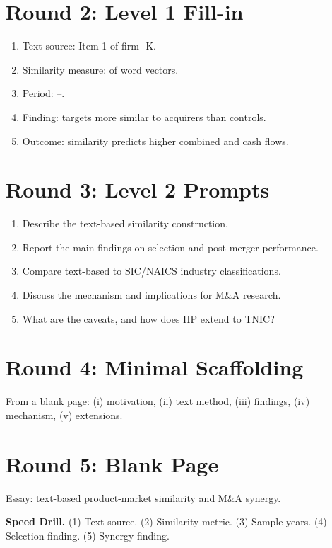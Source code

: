 \documentclass[11pt]{article}
\newcommand{\blank}[1]{\underline{\hspace{#1}}}
\begin{document}
\section*{Round 2: Level 1 Fill-in}
\begin{enumerate}
\item Text source: Item 1 of firm \blank{1cm}-K.
\item Similarity measure: \blank{2cm} of word vectors.
\item Period: \blank{1cm}--\blank{1cm}.
\item Finding: targets more similar to acquirers than \blank{2cm} controls.
\item Outcome: similarity predicts higher combined \blank{2cm} and cash flows.
\end{enumerate}

\section*{Round 3: Level 2 Prompts}
\begin{enumerate}
\item Describe the text-based similarity construction.
\item Report the main findings on selection and post-merger performance.
\item Compare text-based to SIC/NAICS industry classifications.
\item Discuss the mechanism and implications for M\&A research.
\item What are the caveats, and how does HP extend to TNIC?
\end{enumerate}

\section*{Round 4: Minimal Scaffolding}
From a blank page: (i) motivation, (ii) text method, (iii) findings, (iv) mechanism, (v) extensions.

\section*{Round 5: Blank Page}
Essay: text-based product-market similarity and M\&A synergy.

\vspace{6pt}
\begin{drillbox}
\textbf{Speed Drill.} (1) Text source. (2) Similarity metric. (3) Sample years. (4) Selection finding. (5) Synergy finding.
\end{drillbox}
\end{document}

